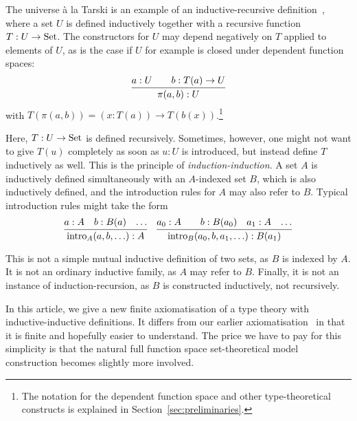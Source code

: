 \documentclass{article}
\begin{document}
The universe \`a la Tarski is an example of an inductive-recursive
definition~\cite{dybjer2000IR}, where a set $U$ is defined inductively
together with a recursive function $T : U \to \text{Set}$.  The constructors
for $U$ may depend negatively on $T$ applied to elements of $U$, as is
the case if $U$ for example is closed under dependent function spaces:
\[
\infer{\pi(a, b) : U}{a : U & \quad b : T(a) \to U}
\]
with $T(\pi(a, b)) = (x : T(a)) \to T(b(x))$.\footnote{The notation
  for the dependent function space and other type-theoretical
  constructs is explained in Section~\ref{sec:preliminaries}.}

Here, $T : U \to \text{Set}$ is defined recursively. Sometimes, however, one
might not want to give $T(u)$ completely as soon as $u : U$ is
introduced, but instead define $T$ inductively as well. This is the
principle of \emph{induction-induction}. A set $A$ is inductively
defined simultaneously with an $A$-indexed set $B$, which is also
inductively defined, and the introduction rules for $A$ may also refer
to $B$. Typical introduction rules might take the form
\[ \infer{\text{intro}_A(a, b, \ldots) : A}{a : A &b : B(a) & \ldots} \quad
\infer{\text{intro}_B(a_0, b, a_1, \ldots) : B(a_1)}{a_0 : A &
&b : B(a_0) & a_1 : A & \ldots} \]

This is not a simple mutual inductive definition of two sets, as $B$
is indexed by $A$. It is not an ordinary inductive family, as $A$ may
refer to $B$. Finally, it is not an instance of induction-recursion,
as $B$ is constructed inductively, not recursively.

In this article, we give a new finite axiomatisation of a type theory
with inductive-inductive definitions. It differs from our earlier
axiomatisation~\cite{nordvallforsbergSetzer2010indind} in that it is
finite and hopefully easier to understand. The price we have to pay
for this simplicity is that the natural full function space
set-theoretical model construction becomes slightly more involved.




\end{document}
